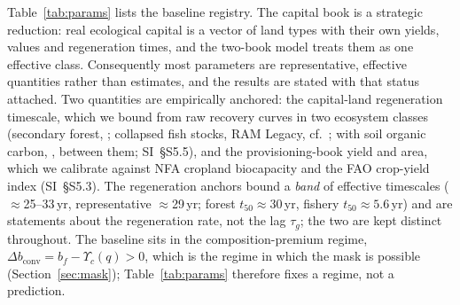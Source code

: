 \documentclass[preprint,12pt,authoryear]{elsarticle}
\newcommand{\dconv}{\Delta b_{\mathrm{conv}}}
\newcommand{\Ups}{\Upsilon_c}
\begin{document}
Table~\ref{tab:params} lists the baseline registry. The capital book is a strategic reduction: real ecological capital is a vector of land types with their own yields, values and regeneration times, and the two-book model treats them as one effective class. Consequently most parameters are representative, effective quantities rather than estimates, and the results are stated with that status attached. Two quantities are empirically anchored: the capital-land regeneration timescale, which we bound from raw recovery curves in two ecosystem classes (secondary forest, \citealp{Poorter2016}; collapsed fish stocks, RAM Legacy, cf.\ \citealp{HutchingsReynolds2004,Neubauer2013}; with soil organic carbon, \citealp{Poeplau2011}, between them; SI~\S S5.5), and the provisioning-book yield and area, which we calibrate against NFA cropland biocapacity and the FAO crop-yield index (SI~\S S5.3). The regeneration anchors bound a \emph{band} of effective timescales ($\approx$25--33\,yr, representative $\approx$29\,yr; forest $t_{50}\approx30$\,yr, fishery $t_{50}\approx5.6$\,yr) and are statements about the regeneration rate, not the lag $\tau_g$; the two are kept distinct throughout. The baseline sits in the composition-premium regime, $\dconv=b_f-\Ups(q)>0$, which is the regime in which the mask is possible (Section~\ref{sec:mask}); Table~\ref{tab:params} therefore fixes a regime, not a prediction.
\end{document}
